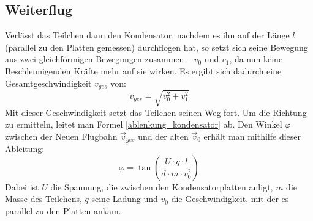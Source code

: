 		\subsection{Weiterflug}
Verlässt das Teilchen dann den Kondensator, nachdem es ihn auf der Länge \(l\) (parallel zu den Platten gemessen) durchflogen hat, so setzt sich seine Bewegung aus zwei gleichförmigen Bewegungen zusammen -- \(v_0\) und \(v_1\), da nun keine Beschleunigenden Kräfte mehr auf sie wirken. Es ergibt sich dadurch eine Gesamtgeschwindigkeit \(v_{ges}\) von:
	\begin{equation}
	v_{ges} = \sqrt{v_0^2 + v_1^2}
	\end{equation}
Mit dieser Geschwindigkeit setzt das Teilchen seinen Weg fort. Um die Richtung zu ermitteln, leitet man Formel \ref{ablenkung_kondensator} ab. Den Winkel \(\varphi\) zwischen der Neuen Flugbahn \(\vec{v}_{ges}\) und der alten \(\vec{v}_0\) erhält man mithilfe dieser Ableitung:
	\begin{equation}
	\varphi = \tan \left ( \frac{U \cdot q \cdot l}{d \cdot m \cdot v_0^2} \right )
	\end{equation}
Dabei ist \(U\) die Spannung, die zwischen den Kondensatorplatten anligt, \(m\) die Masse des Teilchens, \(q\) seine Ladung und \(v_0\) die Geschwindigkeit, mit der es parallel zu den Platten ankam.


%
%
